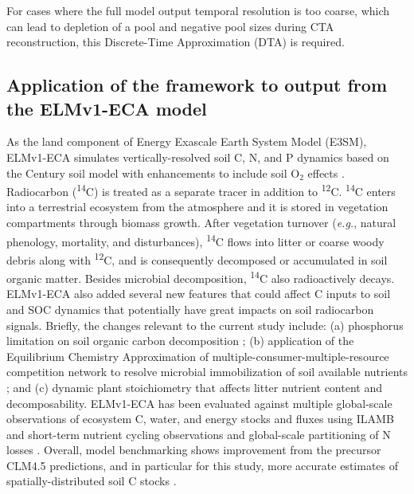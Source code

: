 \documentclass[draft]{agujournal2019}
\begin{document}
    For cases where the full model output temporal resolution is too coarse, which can lead to depletion of a pool and negative pool sizes during CTA reconstruction, this Discrete-Time Approximation (DTA) is required.

\subsection{Application of the framework to output from the ELMv1-ECA model}
   
    As the land component of Energy Exascale Earth System Model (E3SM), ELMv1-ECA \cite{Zhu2019} simulates vertically-resolved soil C, N, and P dynamics based on the Century soil model \cite{Parton1993} with enhancements  to include soil O$_2$ effects \cite{Koven2013}. Radiocarbon (\textsuperscript{14}C) is treated as a separate tracer in addition to \textsuperscript{12}C. \textsuperscript{14}C enters into a terrestrial ecosystem from the atmosphere \cite{Graven2017} and it is stored in vegetation compartments through biomass growth. After vegetation turnover (\textit{e.g.}, natural phenology, mortality, and disturbances), \textsuperscript{14}C flows into litter or coarse woody debris  along with \textsuperscript{12}C, and is consequently decomposed or accumulated in soil organic matter. Besides microbial decomposition, \textsuperscript{14}C also radioactively decays. ELMv1-ECA also added several new features that could affect C inputs to soil and SOC dynamics that potentially have great impacts on soil radiocarbon signals. Briefly, the changes relevant to the current study include: (a) phosphorus limitation on soil organic carbon decomposition \cite{zhu2016bg}; (b) application of the Equilibrium Chemistry Approximation of multiple-consumer-multiple-resource competition network to resolve microbial immobilization of soil available nutrients \cite{Tang2013, Zhu2017ea}; and (c) dynamic plant stoichiometry that affects litter nutrient content and decomposability. ELMv1-ECA has been evaluated against multiple global-scale observations of ecosystem C, water, and energy stocks and fluxes using ILAMB \cite{Collier2018, Zhu2019} and short-term nutrient cycling observations and global-scale partitioning of N losses \cite{Zhu2015ncc, Riley2018}. Overall, model benchmarking shows improvement from the precursor CLM4.5 predictions, and in particular for this study, more accurate estimates of spatially-distributed soil C stocks \cite{Zhu2019}.
    
\end{document}
